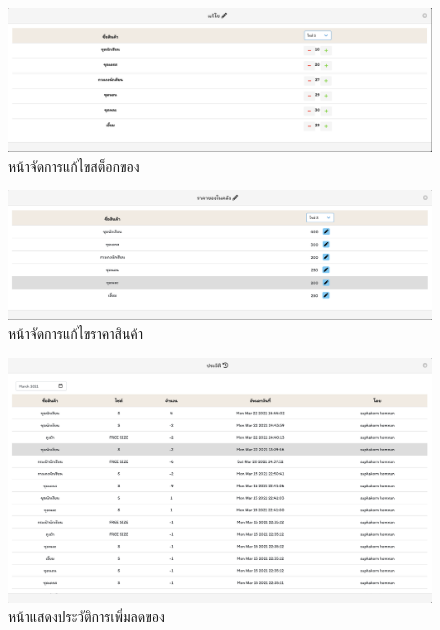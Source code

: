\begin{itemize}
  
    \begin{figure}
      \begin{center}
      \includegraphics[width=\linewidth]{images/handleStock.png}
      \end{center}
      \caption[หน้าจัดการแก้ไขสต็อกของ]{หน้าจัดการแก้ไขสต็อกของ}
      \label{fig:CheckStock}
      \end{figure}
  
  
  
    \begin{figure}
      \begin{center}
      \includegraphics[width=\linewidth]{images/editPrice.png}
      \end{center}
      \caption[หน้าจัดการแก้ไขราคาสินค้า]{หน้าจัดการแก้ไขราคาสินค้า}
      \label{fig:editPrice}
      \end{figure}
  
  
    \begin{figure}
      \begin{center}
      \includegraphics[width=\linewidth]{images/historyStock.png}
      \end{center}
      \caption[หน้าแสดงประวัติการเพิ่มลดของ]{หน้าแสดงประวัติการเพิ่มลดของ}
      \label{fig:HistoryStock}
    \end{figure}
  

\end{itemize}
